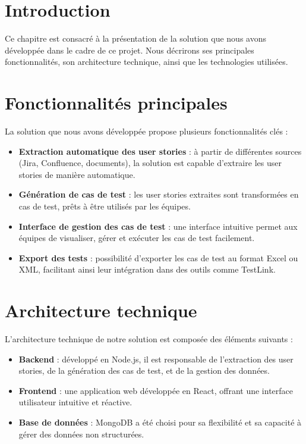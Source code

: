 \documentclass[12pt,a4paper]{report}
\begin{document}
\section{Introduction}
Ce chapitre est consacré à la présentation de la solution que nous avons développée dans le cadre de ce projet. Nous décrirons ses principales fonctionnalités, son architecture technique, ainsi que les technologies utilisées.

\section{Fonctionnalités principales}
La solution que nous avons développée propose plusieurs fonctionnalités clés :
\begin{itemize}
    \item \textbf{Extraction automatique des user stories} : à partir de différentes sources (Jira, Confluence, documents), la solution est capable d'extraire les user stories de manière automatique.
    \item \textbf{Génération de cas de test} : les user stories extraites sont transformées en cas de test, prêts à être utilisés par les équipes.
    \item \textbf{Interface de gestion des cas de test} : une interface intuitive permet aux équipes de visualiser, gérer et exécuter les cas de test facilement.
    \item \textbf{Export des tests} : possibilité d'exporter les cas de test au format Excel ou XML, facilitant ainsi leur intégration dans des outils comme TestLink.
\end{itemize}

\section{Architecture technique}
L'architecture technique de notre solution est composée des éléments suivants :
\begin{itemize}
    \item \textbf{Backend} : développé en Node.js, il est responsable de l'extraction des user stories, de la génération des cas de test, et de la gestion des données.
    \item \textbf{Frontend} : une application web développée en React, offrant une interface utilisateur intuitive et réactive.
    \item \textbf{Base de données} : MongoDB a été choisi pour sa flexibilité et sa capacité à gérer des données non structurées.
\end{itemize}
\end{document}
